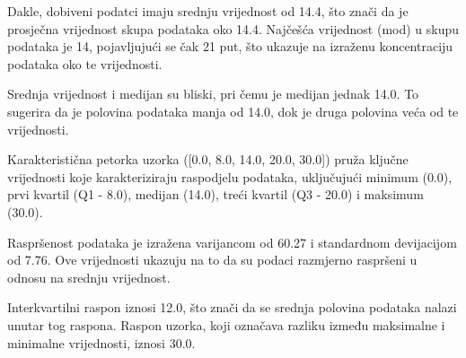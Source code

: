 Dakle, dobiveni podatci imaju srednju vrijednost od 14.4, što znači da je prosječna vrijednost skupa podataka oko 14.4. Najčešća vrijednost (mod) u skupu podataka je 14, pojavljujući se čak 21 put, što ukazuje na izraženu koncentraciju podataka oko te vrijednosti.

Srednja vrijednost i medijan su bliski, pri čemu je medijan jednak 14.0. To sugerira da je polovina podataka manja od 14.0, dok je druga polovina veća od te vrijednosti.

Karakteristična petorka uzorka ([0.0, 8.0, 14.0, 20.0, 30.0]) pruža ključne vrijednosti koje karakteriziraju raspodjelu podataka, uključujući minimum (0.0), prvi kvartil (Q1 - 8.0), medijan (14.0), treći kvartil (Q3 - 20.0) i maksimum (30.0).

Raspršenost podataka je izražena varijancom od 60.27 i standardnom devijacijom od 7.76. Ove vrijednosti ukazuju na to da su podaci razmjerno raspršeni u odnosu na srednju vrijednost.

Interkvartilni raspon iznosi 12.0, što znači da se srednja polovina podataka nalazi unutar tog raspona. Raspon uzorka, koji označava razliku između maksimalne i minimalne vrijednosti, iznosi 30.0.